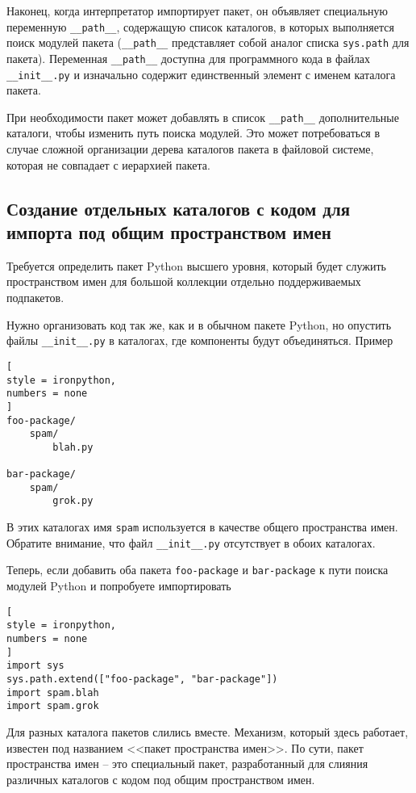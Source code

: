 \documentclass[%
	11pt,
	a4paper,
	utf8,
		]{article}
\begin{document}
Наконец, когда интерпретатор импортирует пакет, он объявляет специальную переменную \verb|__path__|, содержащую список каталогов, в которых выполняется поиск модулей пакета (\verb|__path__| представляет собой аналог списка \texttt{sys.path} для пакета). Переменная \verb|__path__| доступна для программного кода в файлах \verb|__init__.py| и изначально содержит единственный элемент с именем каталога пакета.

При необходимости пакет может добавлять в список \verb|__path__| дополнительные каталоги, чтобы изменить путь поиска модулей. Это может потребоваться в случае сложной организации дерева каталогов пакета в файловой системе, которая не совпадает с иерархией пакета.

\subsection{Создание отдельных каталогов с кодом для импорта под общим пространством имен}

Требуется определить пакет Python высшего уровня, который будет служить пространством имен для большой коллекции отдельно поддерживаемых подпакетов.

Нужно организовать код так же, как и в обычном пакете Python, но опустить файлы \verb|__init__.py| в каталогах, где компоненты будут объединяться. Пример \cite[]{beazley:python_cookbook-2019}
\begin{lstlisting}[
style = ironpython,
numbers = none
]
foo-package/
    spam/
        blah.py
        
bar-package/
    spam/
        grok.py
\end{lstlisting}

В этих каталогах имя \texttt{spam} используется в качестве общего пространства имен. Обратите внимание, что файл \verb|__init__.py| отсутствует в обоих каталогах.

Теперь, если добавить оба пакета \texttt{foo-package} и \texttt{bar-package} к пути поиска модулей Python и попробуете импортировать
\begin{lstlisting}[
style = ironpython,
numbers = none
]
import sys
sys.path.extend(["foo-package", "bar-package"])
import spam.blah
import spam.grok
\end{lstlisting}

Для разных каталога пакетов слились вместе. Механизм, который здесь работает, известен под названием <<пакет пространства имен>>. По сути, пакет пространства имен -- это специальный пакет, разработанный для слияния различных каталогов с кодом под общим пространством имен.
\end{document}
